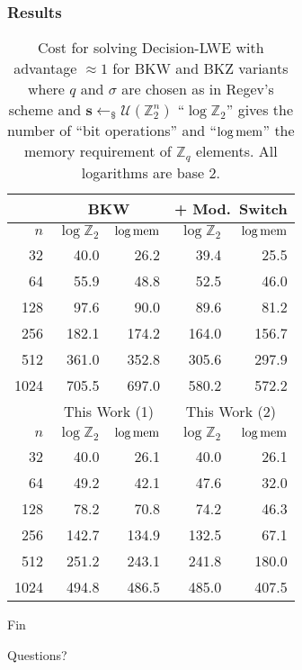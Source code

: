 \documentclass[10pt]{beamer}
\newcommand{\U}[1]{\ensuremath{\mathcal{U}(#1)\xspace}}
\renewcommand{\vec}[1]{\mathbf{#1}\xspace}
\newcommand{\Z}{\ensuremath{\mathbb{Z}}\xspace}
\newcommand{\Zq}{\ensuremath{\Z_q}\xspace}
\newcommand{\sample}{\ensuremath{\leftarrow_{\$}}}
\begin{document}
\begin{frame}
\frametitle{Results}

\begin{table}[htbp]
\footnotesize
\centering
\begin{tabular}{|r||r|r||r|r|}
\hline
    & \multicolumn{2}{|c||}{BKW} & \multicolumn{2}{|c|}{+ Mod.\ Switch}\\
\hline
$n$ & $\log \Z_2$ & $\log \textnormal{mem}$ &$\log \Z_2$ & $\log \textnormal{mem}$\\
\hline
  32 &  40.0 &     26.2  &   39.4 &     25.5\\
  64 &  55.9 &     48.8  &   52.5 &     46.0\\
 128 &  97.6 &     90.0  &   89.6 &     81.2\\
 256 & 182.1 &    174.2  &  164.0 &    156.7\\
 512 & 361.0 &    352.8  &  305.6 &    297.9\\
1024 & 705.5 &    697.0  &  580.2 &    572.2\\
\hline
    & \multicolumn{2}{|c||}{This Work (1)} & \multicolumn{2}{|c|}{This Work (2)}\\
\hline
$n$ & $\log \Z_2$ & $\log \textnormal{mem}$ &$\log \Z_2$ & $\log \textnormal{mem}$\\
\hline
  32 &  40.0 &     26.1 &  40.0 &     26.1\\
  64 &  49.2 &     42.1 &  47.6 &     32.0\\
 128 &  78.2 &     70.8 &  74.2 &     46.3\\
 256 & 142.7 &    134.9 & 132.5 &     67.1\\
 512 & 251.2 &    243.1 & 241.8 &    180.0\\
1024 & 494.8 &    486.5 & 485.0 &    407.5\\
\hline
\end{tabular}
\caption{Cost for solving Decision-LWE with advantage $\approx 1$ for BKW and BKZ variants where $q$ and $\sigma$ are chosen as in Regev's scheme and $\vec{s} \sample \U{\Z_2^n}$ ``$\log \Z_2$'' gives the number of ``bit operations'' and ``$\log \textnormal{mem}$'' the memory requirement of $\Zq$ elements. All logarithms are base 2.}
\label{tab:modred}
\end{table}
\end{frame}

\begin{frame}{Fin}
\begin{center}
\large{Questions?}
\end{center}
\end{frame}
\end{document}
